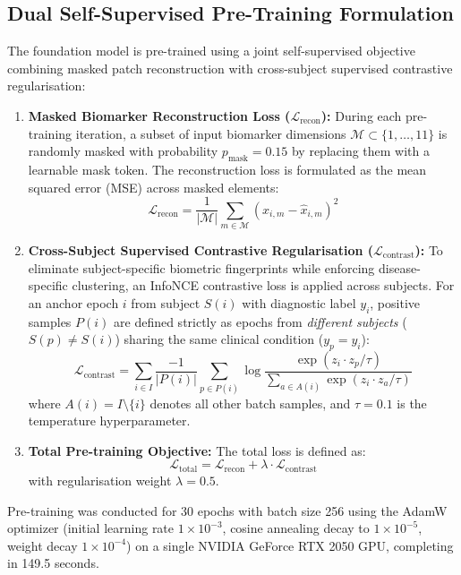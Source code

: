 \documentclass[11pt,a4paper]{article}
\begin{document}
\subsection{Dual Self-Supervised Pre-Training Formulation}
The foundation model is pre-trained using a joint self-supervised objective combining masked patch reconstruction with cross-subject supervised contrastive regularisation:
\begin{enumerate}
    \item \textbf{Masked Biomarker Reconstruction Loss ($\mathcal{L}_{\text{recon}}$):} During each pre-training iteration, a subset of input biomarker dimensions $\mathcal{M} \subset \{1, \dots, 11\}$ is randomly masked with probability $p_{\text{mask}} = 0.15$ by replacing them with a learnable mask token. The reconstruction loss is formulated as the mean squared error (MSE) across masked elements:
    \begin{equation}
        \mathcal{L}_{\text{recon}} = \frac{1}{|\mathcal{M}|} \sum_{m \in \mathcal{M}} \left( x_{i,m} - \hat{x}_{i,m} \right)^2
    \end{equation}
    \item \textbf{Cross-Subject Supervised Contrastive Regularisation ($\mathcal{L}_{\text{contrast}}$):} To eliminate subject-specific biometric fingerprints while enforcing disease-specific clustering, an InfoNCE contrastive loss is applied across subjects. For an anchor epoch $i$ from subject $S(i)$ with diagnostic label $y_i$, positive samples $P(i)$ are defined strictly as epochs from \textit{different subjects} ($S(p) \neq S(i)$) sharing the same clinical condition ($y_p = y_i$):
    \begin{equation}
        \mathcal{L}_{\text{contrast}} = \sum_{i \in I} \frac{-1}{|P(i)|} \sum_{p \in P(i)} \log \frac{\exp\left(z_i \cdot z_p / \tau\right)}{\sum_{a \in A(i)} \exp\left(z_i \cdot z_a / \tau\right)}
    \end{equation}
    where $A(i) = I \setminus \{i\}$ denotes all other batch samples, and $\tau = 0.1$ is the temperature hyperparameter.
    \item \textbf{Total Pre-training Objective:} The total loss is defined as:
    \begin{equation}
        \mathcal{L}_{\text{total}} = \mathcal{L}_{\text{recon}} + \lambda \cdot \mathcal{L}_{\text{contrast}}
    \end{equation}
    with regularisation weight $\lambda = 0.5$.
\end{enumerate}
Pre-training was conducted for 30 epochs with batch size 256 using the AdamW optimizer (initial learning rate $1 \times 10^{-3}$, cosine annealing decay to $1 \times 10^{-5}$, weight decay $1 \times 10^{-4}$) on a single NVIDIA GeForce RTX 2050 GPU, completing in 149.5 seconds.
\end{document}
